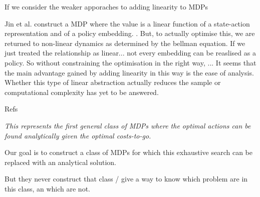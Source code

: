 If we consider the weaker apporaches to adding linearity to MDPs

Jin et al. construct a MDP where the value is a linear function of a state-action representation and of a policy embedding. \cite{Wang}.
But, to actually optimise this, we are returned to non-linear dynamics as determined by the bellman equation.
If we just treated the relationship as linear... not every embedding can be reaslised as a policy.
So without constraining the optimisation in the right way, ...
It seems that the main advantage gained by adding linearity in this way is the ease of analysis.
Whether this type of linear abstraction actually reduces the sample or computational complexity has yet to be answered.


Refs \cite{Todorov2006,Todorov2009,Zhong,Zhonga,Dvijotham,Wozabal}


\begin{displayquote}
  \textit{This represents the first general class of MDPs where the optimal
actions can be found analytically given the optimal costs-to-go.}
\end{displayquote}

Our goal is to construct a class of MDPs for which this exhaustive search can
be replaced with an analytical solution.

But they never construct that class / give a way to know which problem are in this class, an which are not.
